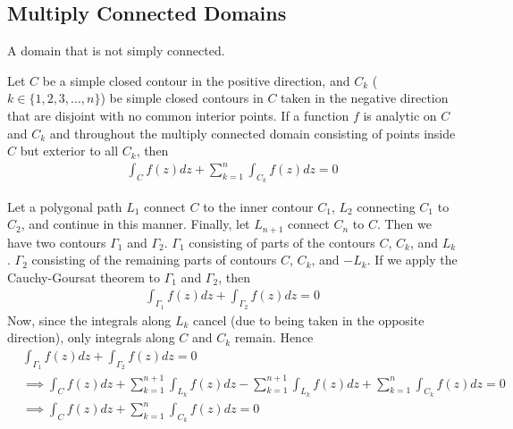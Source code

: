 \documentclass[12pt, english]{book}
\makeatletter
\renewenvironment{proof}[1][\proofname]{\par
	\pushQED{\qed}%
	\normalfont \topsep6\p@\@plus6\p@\relax
	\list{}{%
		\settowidth{\leftmargin}{\itshape\proofname:\hskip\labelsep}%
		\setlength{\labelwidth}{0pt}%
		\setlength{\itemindent}{-\leftmargin}%
	}%
	\item[\hskip\labelsep\itshape#1\@addpunct{:}]\ignorespaces
	}{ \popQED\endlist\@endpefalse}
\makeatother
\begin{document}
	\subsection{Multiply Connected Domains} \label{Multiply Connected Domains Subsection - Complex}
	
	\begin{definition}
		A domain that is not simply connected.
	\end{definition}

	\begin{theorem}
		\label{Contour integral over Multiply Connected Domains Theorem - Complex}
		Let \(C\) be a simple closed contour in the positive direction, and \(C_k\) (\(k \in \{1,2,3,\ldots, n\}\)) be simple closed contours in \(C\) taken in the negative direction that are disjoint with no common interior points. If a function \(f\) is analytic on \(C\) and \(C_k\) and throughout the multiply connected domain consisting of points inside \(C\) but exterior to all \(C_k\), then
		\begin{align*}
			\int_{C} f(z) dz + \sum_{k=1}^{n} \int_{C_k} f(z) dz = 0
		\end{align*}
	\end{theorem}
	\begin{proof}
		Let a polygonal path \(L_1\) connect \(C\) to the inner contour \(C_1\), \(L_2\) connecting \(C_1\) to \(C_2\), and continue in this manner. Finally, let \(L_{n+1}\) connect \(C_n\) to \(C\). Then we have two contours \(\Gamma_1\) and \(\Gamma_2\). \(\Gamma_1\) consisting of parts of the contours \(C\), \(C_k\), and \(L_k\). \(\Gamma_2\) consisting of the remaining parts of contours \(C\), \(C_k\), and \(-L_k\). If we apply the Cauchy-Goursat theorem to \(\Gamma_1\) and \(\Gamma_2\), then
		\begin{align*}
			\int_{\Gamma_1} f(z) dz + \int_{\Gamma_2} f(z) dz = 0
		\end{align*}
		Now, since the integrals along \(L_k\) cancel (due to being taken in the opposite direction), only integrals along \(C\) and \(C_k\) remain. Hence
		\begin{align*}
			&\int_{\Gamma_1} f(z) dz + \int_{\Gamma_2} f(z) dz = 0 \\
			&\implies \int_{C} f(z) dz + \sum_{k=1}^{n+1} \int_{L_k} f(z) dz - \sum_{k=1}^{n+1} \int_{L_k} f(z) dz + \sum_{k=1}^{n} \int_{C_k} f(z) dz = 0 \\
			&\implies \int_{C} f(z) dz + \sum_{k=1}^{n} \int_{C_k} f(z) dz = 0
		\end{align*}
	\end{proof}
\end{document}
